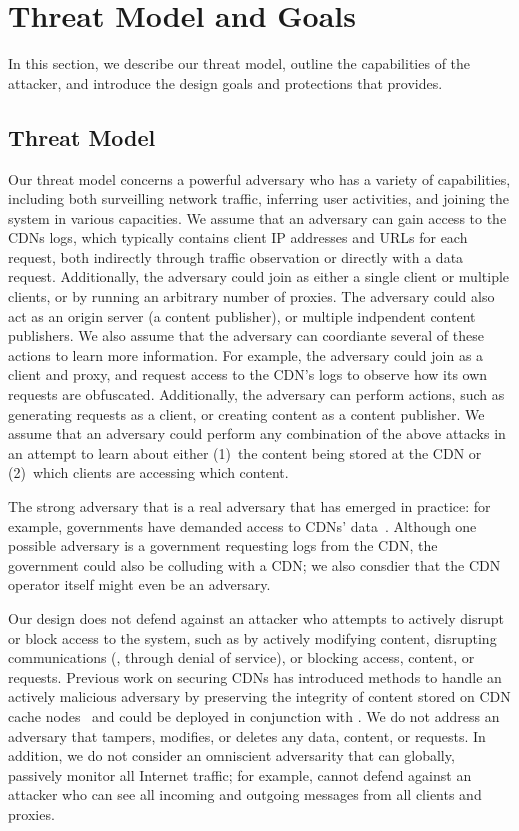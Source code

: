 \section{Threat Model and Goals}
\label{sec:threat}
In this section, we describe our threat model, outline the capabilities of the 
attacker, and introduce the design goals and protections that \system{} provides.

\subsection{Threat Model}
\label{sec:attacker}

Our threat model concerns a powerful adversary who has a variety of capabilities,
including both surveilling network traffic, inferring user activities, and joining
the system in various capacities.
We assume that an adversary can gain
access to the CDNs logs, which typically contains client IP addresses and URLs for
each request, both indirectly through traffic observation or directly with a data
request. Additionally,
the adversary could join \system{} as either a single client or multiple clients,
or by running an arbitrary number of \system{} proxies.  The adversary could 
also act as an origin server (a content publisher), or multiple indpendent content
publishers. We also assume that the adversary
can coordiante several of these actions to learn more information.  For example, the 
adversary could join as a client and proxy, and request access to the CDN's
logs to observe how its own requests are obfuscated.  Additionally, 
the adversary can perform actions, such as generating requests as a client, or creating content 
as a content publisher. We assume that an adversary could perform any combination
of the above attacks in an attempt to learn about either (1)~the content being stored
at the CDN or (2)~which clients are accessing which content.  

The strong adversary that is a real adversary that has emerged in practice:
for example, governments have demanded access to CDNs'
data~\cite{cloudflare_nsl}.  Although one possible adversary is a government
requesting logs from the CDN,  the government could also be colluding with a
CDN; we also consdier that the CDN operator itself might even be an adversary.

Our design does not defend against an attacker who attempts to actively
disrupt or block access to the system, such as by actively modifying content,
disrupting communications (\eg, through denial of service), or blocking
access, content, or requests. Previous work on securing CDNs has introduced
methods to handle an actively malicious adversary by preserving the integrity
of content  stored on CDN cache nodes~\cite{levy2015stickler} and could be
deployed in conjunction with \system{}. We do not address an adversary that
tampers, modifies, or deletes any data, content, or requests.  In addition, we
do not consider an omniscient adversarity that can globally, passively monitor
all Internet traffic; for example, \system{} cannot defend against an attacker
who can see all incoming and outgoing messages from all clients and proxies.

